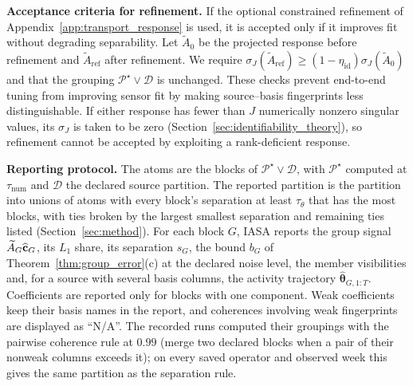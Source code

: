 \noindent\textbf{Acceptance criteria for refinement.}
If the optional constrained refinement of
Appendix~\ref{app:transport_response} is used, it is accepted only if it improves
fit without degrading separability.  Let \(\widetilde A_{0}\) be the
projected response before refinement and \(\widetilde A_{\mathrm{ref}}\)
after refinement.  We require
\(\sigma_J(\widetilde A_{\mathrm{ref}})\ge
(1-\eta_{\mathrm{id}})\sigma_J(\widetilde A_{0})\) and
that the grouping \(\mathcal P^\star\vee\mathcal D\) is unchanged.  These checks prevent end-to-end tuning from improving
sensor fit by making source--basis fingerprints less distinguishable.  If either
response has fewer than \(J\) numerically nonzero singular values, its
\(\sigma_J\) is taken to be zero
(Section~\ref{sec:identifiability_theory}), so refinement cannot be
accepted by exploiting a rank-deficient response.

\noindent\textbf{Reporting protocol.}
The atoms are the blocks of \(\mathcal P^\star\vee\mathcal D\), with \(\mathcal P^\star\)
computed at \(\tau_{\mathrm{num}}\) and \(\mathcal D\) the declared source partition.  The
reported partition is the partition into unions of atoms with every block's separation
at least \(\tau_\theta\) that has the most blocks, with ties broken by the largest
smallest separation and remaining ties listed (Section~\ref{sec:method}).  For each block
\(G\), IASA reports the group signal \(\widetilde A_G\widehat{\mathbf c}_G\), its \(L_1\) share, its
separation \(s_G\), the bound \(b_G\) of Theorem~\ref{thm:group_error}(c) at the declared
noise level, the member visibilities and, for a source with several basis columns, the
activity trajectory \(\widehat{\boldsymbol\theta}_{G,1:T}\).  Coefficients are reported only
for blocks with one component.  Weak coefficients keep their basis names in the report,
and coherences involving weak fingerprints are displayed as ``N/A''.  The recorded runs
computed their groupings with the pairwise coherence rule at \(0.99\) (merge two
declared blocks when a pair of their nonweak columns exceeds it); on every saved
operator and observed week this gives the same partition as the separation rule.
